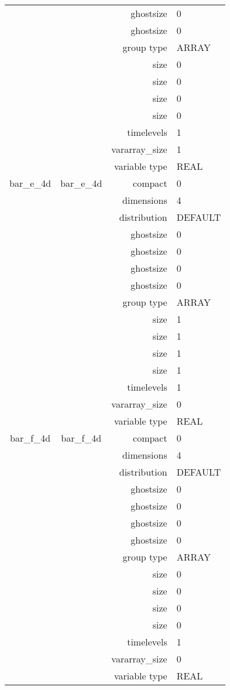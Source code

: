 \begin{tabular*}{150mm}{|c|c@{\extracolsep{\fill}}|rl|}
 &  & ghostsize & 0 \\ 
 &  & ghostsize & 0 \\ 
 &  & group type & ARRAY \\ 
 &  & size & 0 \\ 
& ~ & size & 0 \\ 
 &  & size & 0 \\ 
 &  & size & 0 \\ 
 &  & timelevels & 1 \\ 
 &  & vararray\_size & 1 \\ 
 &  & variable type & REAL \\ 
\hline 
bar\_e\_4d & bar\_e\_4d & compact & 0 \\ 
 &  & dimensions & 4 \\ 
 &  & distribution & DEFAULT \\ 
 &  & ghostsize & 0 \\ 
& ~ & ghostsize & 0 \\ 
 &  & ghostsize & 0 \\ 
 &  & ghostsize & 0 \\ 
 &  & group type & ARRAY \\ 
 &  & size & 1 \\ 
& ~ & size & 1 \\ 
 &  & size & 1 \\ 
 &  & size & 1 \\ 
 &  & timelevels & 1 \\ 
 &  & vararray\_size & 0 \\ 
 &  & variable type & REAL \\ 
\hline 
bar\_f\_4d & bar\_f\_4d & compact & 0 \\ 
 &  & dimensions & 4 \\ 
 &  & distribution & DEFAULT \\ 
 &  & ghostsize & 0 \\ 
& ~ & ghostsize & 0 \\ 
 &  & ghostsize & 0 \\ 
 &  & ghostsize & 0 \\ 
 &  & group type & ARRAY \\ 
 &  & size & 0 \\ 
& ~ & size & 0 \\ 
 &  & size & 0 \\ 
 &  & size & 0 \\ 
 &  & timelevels & 1 \\ 
 &  & vararray\_size & 0 \\ 
 &  & variable type & REAL \\ 
\hline 
\end{tabular*} 



